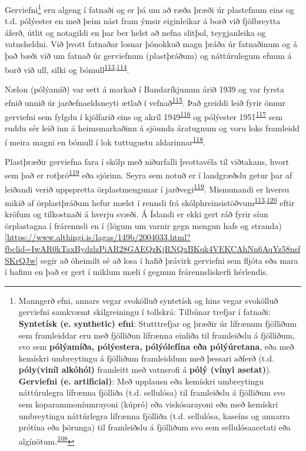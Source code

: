 \documentclass[icelandic,]{book}
\let\rmarkdownfootnote\footnote%
\def\footnote{\protect\rmarkdownfootnote}
\begin{document}
Gerviefni\footnote{Manngerð efni, annars vegar svokölluð syntetísk og hins vegar svokölluð gerviefni samkvæmt skilgreiningu í tollskrá: Tilbúnar trefjar í fatnaði: \textbf{Syntetísk (e. synthetic) efni}: Stutttrefjar og þræðir úr lífrænum fjölliðum sem framleiddar eru með fjölliðun lífrænna einliða til framleiðslu á fjölliðum, svo sem \textbf{pólýamíða, pólýestera, pólýólefína eða pólýúretana}, eða með kemískri umbreytingu á fjölliðum framleiddum með þessari aðferð (t.d. \textbf{póly(viníl alkóhól)} framleitt með vatnsrofi á \textbf{pólý (vínyl asetat)}).
  \textbf{Gerviefni (e. artificial)}: Með upplausn eða kemískri umbreytingu náttúrulegra lífrænna fjölliða (t.d. sellulósa) til framleiðslu á fjölliðum svo sem koparammoníumrayoni (kúpró) eða viskósarayoni eða með kemískri umbreytingu náttúrlegra lífrænna fjölliða (t.d. sellulósa, kaseíns og annarra prótína eða þörunga) til framleiðslu á fjölliðum svo sem sellulósaacetati eða algínötum.\textsuperscript{\protect\hyperlink{ref-tollur2017}{108}}} eru algeng í fatnaði og er þá um að ræða þræði úr plastefnum eins og t.d. pólýester en með þeim nást fram ýmsir eiginleikar á borð við fjölbreytta áferð, útlit og notagildi en þar ber helst að nefna slitþol, teygjanleika og vatnsheldni. Við þvott fatnaðar losnar þónokkuð magn þráða úr fatnaðinum og á það bæði við um fatnað úr gerviefnum (plastþráðum) og náttúrulegum efnum á borð við ull, silki og bómull\textsuperscript{\protect\hyperlink{ref-magnusson2014mikroskrap}{113},\protect\hyperlink{ref-magnusson2014mikroskopiska}{114}}.

Nælon (pólýamíð) var sett á markað í Bandaríkjunum árið 1939 og var fyrsta efnið unnið úr jarðefnaeldsneyti ætlað í vefnað\textsuperscript{\protect\hyperlink{ref-AmericanChemicalSociety1995}{115}}. Það greiddi leið fyrir önnur gerviefni sem fylgdu í kjölfarið eins og akríl 1949\textsuperscript{\protect\hyperlink{ref-masson1995acrylic}{116}} og pólýester 1951\textsuperscript{\protect\hyperlink{ref-brunnschweiler1993polyester}{117}} sem ruddu sér leið inn á heimsmarkaðinn á sjöunda áratugnum og voru loks framleidd í meira magni en bómull í lok tuttugustu aldarinnar\textsuperscript{\protect\hyperlink{ref-Shen2012}{118}}.

Plastþræðir gerviefna fara í skólp með niðurfalli þvottavéla til viðtakans, hvort sem það er rotþró\textsuperscript{\protect\hyperlink{ref-mahon2016microplastics}{119}} eða sjórinn. Seyra sem notuð er í landgræðslu getur þar af leiðandi verið uppspretta örplastmengunar í jarðvegi\textsuperscript{\protect\hyperlink{ref-mahon2016microplastics}{119}}. Mismunandi er hversu mikið af örplastþráðum hefur mælst í rennsli frá skólphreinsistöðvum\textsuperscript{\protect\hyperlink{ref-magnusson2014mikroskrap}{113},\protect\hyperlink{ref-napper2016release}{120}} eftir kröfum og tilkostnaði á hverju svæði. Á Íslandi er ekki gert ráð fyrir síun örplastagna í frárennsli en í (lögum um varnir gegn mengun hafs og stranda) {[}\url{https://www.althingi.is/lagas/149b/2004033.html?fbclid=IwAR0kTaxBydzlzPiAR28GAEQzKjRNQxBKqk4VEKCAhNn6AqYz58nsfSKrQJw}{]} segir að óheimilt sé að losa í hafið þrávirk gerviefni sem fljóta eða mara í hafinu en það er gert í miklum mæli í gegnum frárennsliskerfi hérlendis.
\end{document}
